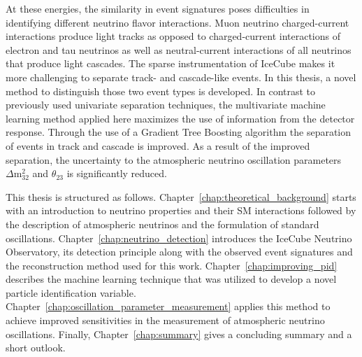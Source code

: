 At these energies, the similarity in event signatures poses difficulties in identifying different neutrino flavor interactions.
Muon neutrino charged-current interactions produce light tracks as opposed to charged-current interactions of electron and tau neutrinos as well as neutral-current interactions of all neutrinos that produce light cascades.
The sparse instrumentation of IceCube makes it more challenging to separate track- and cascade-like events.
In this thesis, a novel method to distinguish those two event types is developed.
In contrast to previously used univariate separation techniques, the multivariate machine learning method applied here maximizes the use of information from the detector response.
Through the use of a Gradient Tree Boosting algorithm the separation of events in track and cascade is improved.
As a result of the improved separation, the uncertainty to the atmospheric neutrino oscillation parameters $\Delta \mathrm{m}^{2}_{32}$ and $\theta_{23}$ is significantly reduced.

This thesis is structured as follows.
Chapter~\ref{chap:theoretical_background} starts with an introduction to neutrino properties and their SM interactions followed by the description of atmospheric neutrinos and the formulation of standard oscillations.
Chapter~\ref{chap:neutrino_detection} introduces the IceCube Neutrino Observatory, its detection principle along with the observed event signatures and the reconstruction method used for this work.
Chapter~\ref{chap:improving_pid} describes the machine learning technique that was utilized to develop a novel particle identification variable.
Chapter~\ref{chap:oscillation_parameter_measurement} applies this method to achieve improved sensitivities in the measurement of atmospheric neutrino oscillations.
Finally, Chapter~\ref{chap:summary} gives a concluding summary and a short outlook.
